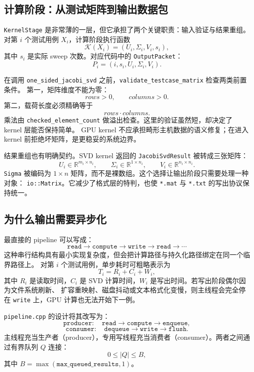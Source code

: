 \subsection{计算阶段：从测试矩阵到输出数据包}

\texttt{KernelStage} 是非常薄的一层，但它承担了两个关键职责：输入验证与结果重组。
对第 $i$ 个测试用例 $X_i$，计算阶段执行函数
\[
    \mathcal{K}(X_i)
    =
    (U_i,\Sigma_i,V_i,s_i),
\]
其中 $s_i$ 是实际 sweep 次数。对应代码中的 \texttt{OutputPacket}：
\[
    P_i
    =
    (i,s_i,U_i,\Sigma_i,V_i).
\]

在调用 \texttt{one\_sided\_jacobi\_svd} 之前，\texttt{validate\_testcase\_matrix} 检查两类前置条件。
第一，矩阵维度不能为零：
\[
    rows>0,\qquad columns>0.
\]
第二，载荷长度必须精确等于
\[
    rows\cdot columns.
\]
乘法由 \texttt{checked\_element\_count} 做溢出检查。这里的验证虽然短，却决定了 kernel 层能否保持简单。
GPU kernel 不应承担畸形主机数据的语义修复；在进入 kernel 前拒绝坏矩阵，是更稳妥的系统边界。

结果重组也有明确契约。SVD kernel 返回的 \texttt{JacobiSvdResult} 被转成三张矩阵：
\[
    U_i\in\mathbb{R}^{m_i\times n_i},
    \qquad
    \Sigma_i\in\mathbb{R}^{1\times n_i},
    \qquad
    V_i\in\mathbb{R}^{n_i\times n_i}.
\]
\texttt{Sigma} 被编码为 $1\times n$ 矩阵，而不是裸数组。这个选择让输出阶段只需要处理一种对象：
\texttt{io::Matrix}。它减少了格式层的特判，也使 \texttt{*.mat} 与 \texttt{*.txt} 的写出协议保持统一。

\subsection{为什么输出需要异步化}

最直接的 pipeline 可以写成：
\[
    \texttt{read}
    \rightarrow
    \texttt{compute}
    \rightarrow
    \texttt{write}
    \rightarrow
    \texttt{read}
    \rightarrow
    \cdots
\]
这种串行结构具有最小实现复杂度，但会把计算路径与持久化路径绑定在同一个临界路径上。
对第 $i$ 个测试用例，单步耗时可粗略表示为
\[
    T_i = R_i + C_i + W_i,
\]
其中 $R_i$ 是读取时间，$C_i$ 是 SVD 计算时间，$W_i$ 是写出时间。若写出阶段偶尔因为文件系统刷新、
扩容重映射、磁盘抖动或文本格式化变慢，则主线程会完全停在 \texttt{write} 上，GPU 计算也无法开始下一例。

\texttt{pipeline.cpp} 的设计将其改写为：
\[
    \texttt{producer}: \quad
    \texttt{read}\rightarrow\texttt{compute}\rightarrow\texttt{enqueue},
\]
\[
    \texttt{consumer}: \quad
    \texttt{dequeue}\rightarrow\texttt{write}\rightarrow\texttt{flush}.
\]
主线程充当生产者（producer），专用写线程充当消费者（consumer）。两者之间通过有界队列 $Q$ 连接：
\[
    0\le |Q|\le B,
\]
其中 $B=\max(\texttt{max\_queued\_results},1)$。

